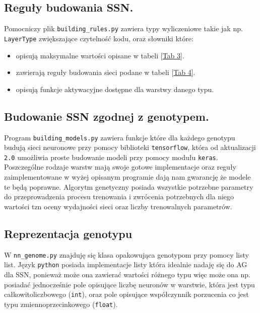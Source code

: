 \documentclass{article}
\begin{document}
\subsection{Reguły budowania SSN.}
Pomocniczy plik \texttt{building\_rules.py} zawiera typy wyliczeniowe takie jak np.
\texttt{LayerType} zwiększające czytelność kodu, oraz słowniki które:
\begin{itemize}
\item opisują maksymalne wartości opisane w tabeli [\hyperref[tab:zakres]{Tab 3}].
\item zawierają reguły budowania sieci podane w tabeli [\hyperref[tab:rules]{Tab 4}].
\item opisują funkcje aktywacyjne dostępne dla warstwy danego typu.
\end{itemize}

\subsection{Budowanie SSN zgodnej z genotypem.}
Program \texttt{building\_models.py} zawiera funkcje które dla każdego genotypu budują sieci neuronowe 
przy pomocy biblioteki \texttt{tensorflow}, która od aktualizacji \texttt{2.0}
umożliwia proste budowanie modeli przy pomocy modułu \texttt{keras}. Poszczególne 
rodzaje warstw mają swoje gotowe implementacje oraz reguły zaimplementowane w wyżej opisanym
programie dają nam gwarancję że modele te będą poprawne. Algorytm genetyczny posiada wszystkie
potrzebne parametry do przeprowadzenia procesu trenowania i zwrócenia potrzebnych dla niego
wartości tzn oceny wydajności sieci oraz liczby trenowalnych parametrów.

\subsection{Reprezentacja genotypu}
W \texttt{nn\_genome.py} znajduję się klasa opakowująca genotypom przy pomocy listy list.
Język \texttt{python} posiada implementacje listy która idealnie nadaję się do AG dla SSN, 
ponieważ może ona zawierać wartości różnego typu więc może ona np. posiadać jednocześnie
pole opisujące liczbę neuronów w warstwie, która jest typu całkowitoliczbowego (\texttt{int}),
oraz pole opisujące współczynnik porzucenia co jest typu zmiennoprzecinkowego 
(\texttt{float}).
\end{document}
